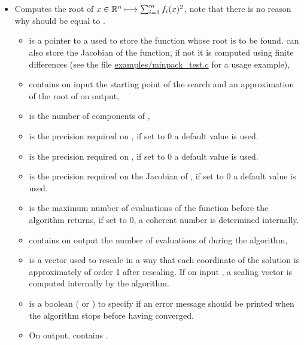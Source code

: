 \begin{itemize}
\item {}
  \sshortdescribe Computes the root of $x \in {\mathbb R}^n \longmapsto
  \sum_{i=1}^m f_i(x)^2$, note that there is no reason why  should
  be equal to .
  \parameters
  \begin{itemize}
  \item {} is a pointer to a  used to
    store the function whose root is to be found.  can also
    store the Jacobian of the function, if not it is computed using
    finite differences (see the file \url{examples/minpack_test.c} for
    a usage example),
  \item  {} contains on input the starting
    point of the search and an approximation of the root of  on
    output,
  \item {} is the number of components of ,
  \item {} is the precision required on , if set to 0 a
    default value is used.
  \item {} is the precision required on , if set to 0 a
    default value is used.
  \item {} is the precision required on the Jacobian of
    , if set to 0 a default value is used.
  \item {} is the maximum number of evaluations of the function
     before the algorithm returns, if set to 0, a coherent
    number is determined internally.
  \item {} contains on output the number of evaluations of
     during the algorithm,
  \item {} is a vector used to rescale  in a way that
    each coordinate of the solution is approximately of order 1 after
    rescaling.  If on input , a scaling vector is
    computed internally by the algorithm.
  \item {} is a boolean ( or ) to
    specify if an error message should be printed when the algorithm
    stops before having converged.
  \item On output,  contains .
  \end{itemize}
\end{itemize}



